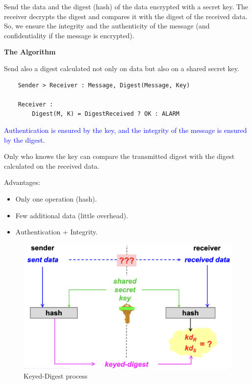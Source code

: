 \hfill

Send the data and the digest (hash) of the data encrypted with a secret key. The receiver decrypts the digest and compares it with the digest of the received data. So, we ensure the integrity and the authenticity of the message (and confidentiality if the message is encrypted).

\hfill

\begin{center}
    \textbf{The Algorithm}
\end{center}
Send also a digest calculated not only on data but also on a shared secret key.
\begin{verbatim}
    Sender > Receiver : Message, Digest(Message, Key)

    Receiver :
        Digest(M, K) = DigestReceived ? OK : ALARM
\end{verbatim}
\textcolor{Blue}{Authentication is ensured by the key, and the integrity of the message is ensured by the digest.}

Only who knows the key can compare the transmitted digest with the digest calculated on the received data.

\hfill


\begin{multicols}{2}
    \raggedcolumns
    Advantages:
    \begin{itemize}
        \item Only one operation (hash).
        \item Few additional data (little overhead).
        \item Authentication + Integrity.
    \end{itemize}
\columnbreak

    
\begin{figure}[H]
    \centering
    \includegraphics[width=\linewidth]{Images/Cryptography/keyed_digest.png}
    \caption{Keyed-Digest process}
\end{figure}
\end{multicols}

